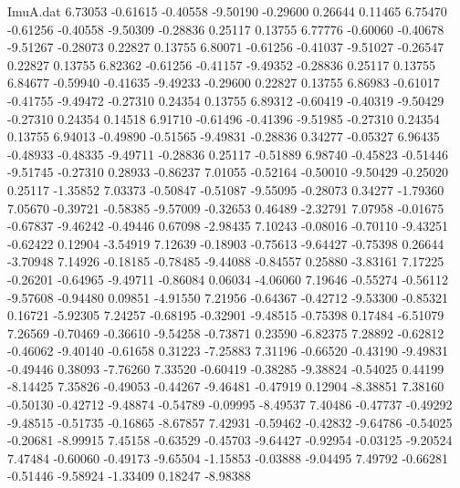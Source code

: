 \begin{filecontents}{ImuA.dat}
   6.73053   -0.61615   -0.40558   -9.50190   -0.29600    0.26644    0.11465
   6.75470   -0.61256   -0.40558   -9.50309   -0.28836    0.25117    0.13755
   6.77776   -0.60060   -0.40678   -9.51267   -0.28073    0.22827    0.13755
   6.80071   -0.61256   -0.41037   -9.51027   -0.26547    0.22827    0.13755
   6.82362   -0.61256   -0.41157   -9.49352   -0.28836    0.25117    0.13755
   6.84677   -0.59940   -0.41635   -9.49233   -0.29600    0.22827    0.13755
   6.86983   -0.61017   -0.41755   -9.49472   -0.27310    0.24354    0.13755
   6.89312   -0.60419   -0.40319   -9.50429   -0.27310    0.24354    0.14518
   6.91710   -0.61496   -0.41396   -9.51985   -0.27310    0.24354    0.13755
   6.94013   -0.49890   -0.51565   -9.49831   -0.28836    0.34277   -0.05327
   6.96435   -0.48933   -0.48335   -9.49711   -0.28836    0.25117   -0.51889
   6.98740   -0.45823   -0.51446   -9.51745   -0.27310    0.28933   -0.86237
   7.01055   -0.52164   -0.50010   -9.50429   -0.25020    0.25117   -1.35852
   7.03373   -0.50847   -0.51087   -9.55095   -0.28073    0.34277   -1.79360
   7.05670   -0.39721   -0.58385   -9.57009   -0.32653    0.46489   -2.32791
   7.07958   -0.01675   -0.67837   -9.46242   -0.49446    0.67098   -2.98435
   7.10243   -0.08016   -0.70110   -9.43251   -0.62422    0.12904   -3.54919
   7.12639   -0.18903   -0.75613   -9.64427   -0.75398    0.26644   -3.70948
   7.14926   -0.18185   -0.78485   -9.44088   -0.84557    0.25880   -3.83161
   7.17225   -0.26201   -0.64965   -9.49711   -0.86084    0.06034   -4.06060
   7.19646   -0.55274   -0.56112   -9.57608   -0.94480    0.09851   -4.91550
   7.21956   -0.64367   -0.42712   -9.53300   -0.85321    0.16721   -5.92305
   7.24257   -0.68195   -0.32901   -9.48515   -0.75398    0.17484   -6.51079
   7.26569   -0.70469   -0.36610   -9.54258   -0.73871    0.23590   -6.82375
   7.28892   -0.62812   -0.46062   -9.40140   -0.61658    0.31223   -7.25883
   7.31196   -0.66520   -0.43190   -9.49831   -0.49446    0.38093   -7.76260
   7.33520   -0.60419   -0.38285   -9.38824   -0.54025    0.44199   -8.14425
   7.35826   -0.49053   -0.44267   -9.46481   -0.47919    0.12904   -8.38851
   7.38160   -0.50130   -0.42712   -9.48874   -0.54789   -0.09995   -8.49537
   7.40486   -0.47737   -0.49292   -9.48515   -0.51735   -0.16865   -8.67857
   7.42931   -0.59462   -0.42832   -9.64786   -0.54025   -0.20681   -8.99915
   7.45158   -0.63529   -0.45703   -9.64427   -0.92954   -0.03125   -9.20524
   7.47484   -0.60060   -0.49173   -9.65504   -1.15853   -0.03888   -9.04495
   7.49792   -0.66281   -0.51446   -9.58924   -1.33409    0.18247   -8.98388

\end{filecontents}
